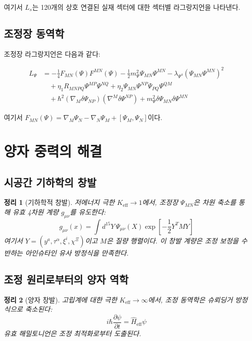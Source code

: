 \documentclass[11pt,a4paper]{article}
\newcommand{\eff}{\text{eff}}
\newtheorem{theorem}{정리}[section]
\theoremstyle{remark}
\newcommand{\Keff}{K_{\mathrm{eff}}}
\begin{document}
	여기서 $L_s$는 120개의 상호 연결된 실재 섹터에 대한 섹터별 라그랑지언을 나타낸다.
	
	\subsection{조정장 동역학}
	
	조정장 라그랑지언은 다음과 같다:
	
	\begin{equation}
		\begin{aligned}
			L_{\Psi} &= -\frac{1}{4} F_{MN}(\Psi) F^{MN}(\Psi)
			- \frac{1}{2} m_{\Psi}^2 \Psi_{MN} \Psi^{MN}
			- \lambda_{\Psi^4} (\Psi_{MN}\Psi^{MN})^2 \\
			&\quad + \eta_1 R_{MNPQ} \Psi^{MP} \Psi^{NQ}
			+ \eta_2 \Psi_{MN}\Psi^{NP}\Psi_{PQ}\Psi^{QM} \\
			&\quad + \hbar^2 (\nabla_M \delta\Psi_{NP})(\nabla^M \delta\Psi^{NP})
			+ m_{\Psi}^2 \delta\Psi_{MN}\delta\Psi^{MN}
		\end{aligned}
	\end{equation}
	
	여기서 $F_{MN}(\Psi) = \nabla_M \Psi_N - \nabla_N \Psi_M + [\Psi_M, \Psi_N]$이다.
	
	\section{양자 중력의 해결}
	\label{sec:quantum-gravity-resolution}
	
	\subsection{시공간 기하학의 창발}
	
	\begin{theorem}[기하학적 창발]
		저에너지 극한 $\Keff \to 1$에서, 조정장 $\Psi_{MN}$은 차원 축소를 통해 유효 4차원 계량 $g_{\mu\nu}$를 유도한다:
		\[
		g_{\mu\nu}(x) = \int d^{15}Y \, \Psi_{\mu\nu}(X) \exp\left[-\frac{1}{2}Y^T M Y\right]
		\]
		여기서 $Y = (y^a, \tau^\alpha, \xi^i, \chi^\Xi)$이고 $M$은 질량 행렬이다. 이 창발 계량은 조정 보정을 수반하는 아인슈타인 유사 방정식을 만족한다.
	\end{theorem}
	
	\subsection{조정 원리로부터의 양자 역학}
	
	\begin{theorem}[양자 창발]
		고립계에 대한 극한 $\Keff \to \infty$에서, 조정 동역학은 슈뢰딩거 방정식으로 축소된다:
		\[
		i\hbar \frac{\partial \psi}{\partial t} = \hat{H}_{\eff} \psi
		\]
		유효 해밀토니언은 조정 최적화로부터 도출된다.
	\end{theorem}
	
\end{document}
